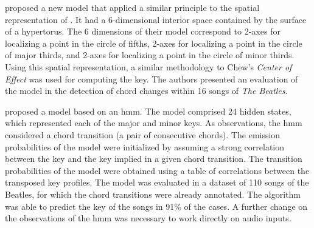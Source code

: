 \textcite{harte2006detecting} proposed a new model that
applied a similar principle to the spatial representation of
\textcite{chew2000towards}. It had a 6-dimensional interior
space contained by the surface of a hypertorus. The 6
dimensions of their model correspond to 2-axes for
localizing a point in the circle of fifths, 2-axes for
localizing a point in the circle of major thirds, and 2-axes
for localizing a point in the circle of minor thirds. Using
this spatial representation, a similar methodology to Chew's
\emph{Center of Effect} \parencite{chew2002spiral} was used
for computing the key. The authors presented an evaluation
of the model in the detection of chord changes within 16
songs of \emph{The Beatles}.




\textcite{noland2006key} proposed a model based on an
\gls{hmm}. The model comprised 24 hidden states, which
represented each of the major and minor keys. As
observations, the \gls{hmm} considered a chord transition (a
pair of consecutive chords). The emission probabilities of
the model were initialized by assuming a strong correlation
between the key and the key implied in a given chord
transition. The transition probabilities of the model were
obtained using a table of correlations between the
transposed \textcite{krumhansl1982tracing} key profiles. The
model was evaluated in a dataset of 110 songs of the
Beatles, for which the chord transitions were already
annotated. The algorithm was able to predict the key of the
songs in 91\% of the cases. A further change on the
observations of the \gls{hmm} was necessary to work directly
on audio inputs.


